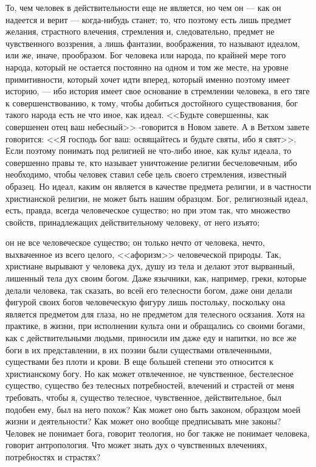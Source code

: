 \documentclass[12pt]{article}
\begin{document}
То, чем человек в действительности еще не является, но чем он --- как он надеется и верит --- когда-нибудь станет; то, что поэтому есть лишь предмет желания, страстного влечения, стремления и, следовательно, предмет не чувственного воззрения, а лишь фантазии, воображения, то называют идеалом, или же, иначе, прообразом. Бог человека или народа, по крайней мере того народа, который не остается постоянно на одном и том же месте, на уровне примитивности, который хочет идти вперед, который именно поэтому имеет историю, --- ибо история имеет свое основание в стремлении человека, в его тяге к совершенствованию, к тому, чтобы добиться достойного существования, бог такого народа есть не что иное, как идеал. <<Будьте совершенны, как совершенен отец ваш небесный>> -говорится в Новом завете. А в Ветхом завете говорится: <<Я господь бог ваш: освящайтесь и будьте святы, ибо я свят>>. Если поэтому понимать под религией не что-либо иное, как культ идеала, то совершенно правы те, кто называет уничтожение религии бесчеловечным, ибо необходимо, чтобы человек ставил себе цель своего стремления, известный образец. Но идеал, каким он является в качестве предмета религии, и в частности христианской религии, не может быть нашим образцом. Бог, религиозный идеал, есть, правда, всегда человеческое существо; но при этом так, что множество свойств, принадлежащих действительному человеку, от него изъято; 

он не все человеческое существо; он только нечто от человека, нечто, выхваченное из всего целого, <<афоризм>> человеческой природы. Так, христиане вырывают у человека дух, душу из тела и делают этот вырванный, лишенный тела дух своим богом. Даже язычники, как, например, греки, которые делали человека, так сказать, во всей его телесности богом, даже они делали фигурой своих богов человеческую фигуру лишь постольку, поскольку она является предметом для глаза, но не предметом для телесного осязания. Хотя на практике, в жизни, при исполнении культа они и обращались со своими богами, как с действительными людьми, приносили им даже еду и напитки, но все же боги в их представлении, в их поэзии были существами отвлеченными, существами без плоти и крови. В еще большей степени это относится к христианскому богу. Но как может отвлеченное, не чувственное, бестелесное существо, существо без телесных потребностей, влечений и страстей от меня требовать, чтобы я, существо телесное, чувственное, действительное, был подобен ему, был на него похож? Как может оно быть законом, образцом моей жизни и деятельности? Как может оно вообще предписывать мне законы? Человек не понимает бога, говорит теология, но бог также не понимает человека, говорит антропология. Что может знать дух о чувственных влечениях, потребностях и страстях? 
\end{document}
